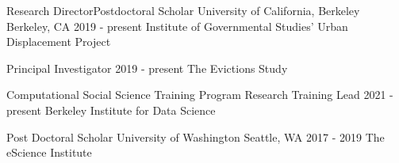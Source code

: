 

\begin{cventries}



  \cventry
    {Research Director{\enskip\cdotp\enskip}Postdoctoral Scholar} %
    {University of California, Berkeley} %
    {Berkeley, CA} %
    {2019 - present} %
    {Institute of Governmental Studies' Urban Displacement Project}

  \cventry
    {Principal Investigator} %
    {} %
    {} %
    {2019 - present} %
    {The Evictions Study}    

  \cventry
    {Computational Social Science Training Program Research Training Lead} %
    {} %
    {} %
    {2021 - present} %
    {Berkeley Institute for Data Science\newline}

  \cventry
    {Post Doctoral Scholar} %
    {University of Washington} %
    {Seattle, WA} %
    {2017 - 2019} %
    {The eScience Institute}

\end{cventries}
